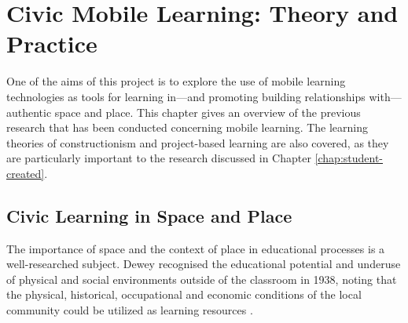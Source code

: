 \chapter{Civic Mobile Learning: Theory and Practice}
\label{chap:MobileLearning}

One of the aims of this project is to explore the use of mobile learning technologies as tools for learning in---and promoting building relationships with---authentic space and place. This chapter gives an overview of the previous research that has been conducted concerning mobile learning. The learning theories of constructionism and project-based learning are also covered, as they are particularly important to the research discussed in Chapter \ref{chap:student-created}.

\section{Civic Learning in Space and Place} 

The importance of space and the context of place in educational processes is a well-researched subject. Dewey recognised the educational potential and underuse of physical and social environments outside of the classroom in 1938, noting that the physical, historical, occupational and economic conditions of the local community could be utilized as learning resources \citep{Dewey1938}. 

